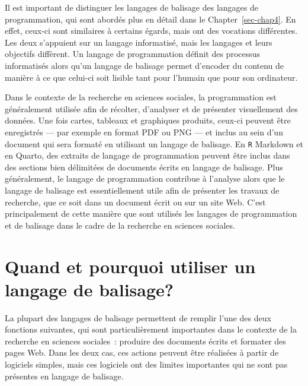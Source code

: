 \documentclass[
  letterpaper,
]{scrbook}
\begin{document}
Il est important de distinguer les langages de balisage des langages de
programmation, qui sont abordés plus en détail dans le
Chapter~\ref{sec-chap4}. En effet, ceux-ci sont similaires à certains
égards, mais ont des vocations différentes. Les deux s'appuient sur un
langage informatisé, mais les langages et leurs objectifs diffèrent. Un
langage de programmation définit des processus informatisés alors qu'un
langage de balisage permet d'encoder du contenu de manière à ce que
celui-ci soit lisible tant pour l'humain que pour son ordinateur.

Dans le contexte de la recherche en sciences sociales, la programmation
est généralement utilisée afin de récolter, d'analyser et de présenter
visuellement des données. Une fois cartes, tableaux et graphiques
produits, ceux-ci peuvent être enregistrés --- par exemple en format PDF
ou PNG --- et inclus au sein d'un document qui sera formaté en utilisant
un langage de balisage. En \texttt{R} Markdown et en Quarto, des
extraits de langage de programmation peuvent être inclus dans des
sections bien délimitées de documents écrits en langage de balisage.
Plus généralement, le langage de programmation contribue à l'analyse
alors que le langage de balisage est essentiellement utile afin de
présenter les travaux de recherche, que ce soit dans un document écrit
ou sur un site Web. C'est principalement de cette manière que sont
utilisés les langages de programmation et de balisage dans le cadre de
la recherche en sciences sociales.

\hypertarget{quand-et-pourquoi-utiliser-un-langage-de-balisage}{%
\section{Quand et pourquoi utiliser un langage de
balisage?}\label{quand-et-pourquoi-utiliser-un-langage-de-balisage}}

La plupart des langages de balisage permettent de remplir l'une des deux
fonctions suivantes, qui sont particulièrement importantes dans le
contexte de la recherche en sciences sociales~: produire des documents
écrits et formater des pages Web. Dans les deux cas, ces actions peuvent
être réalisées à partir de logiciels simples, mais ces logiciels ont des
limites importantes qui ne sont pas présentes en langage de balisage.

\end{document}
